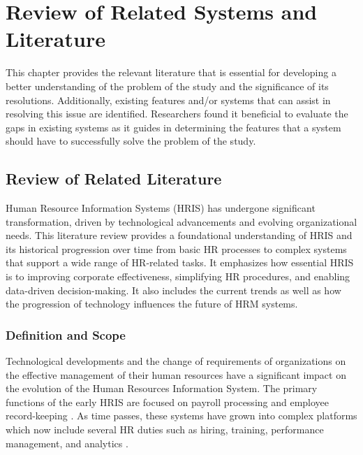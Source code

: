 \chapter{Review of Related Systems and Literature}

This chapter provides the relevant literature that is essential for developing a better understanding of the problem of the study and the significance of its resolutions. Additionally, existing features and/or systems that can assist in resolving this issue are identified. Researchers found it beneficial to evaluate the gaps in existing systems as it guides in determining the features that a system should have to successfully solve the problem of the study.


\section{Review of Related Literature}
    Human Resource Information Systems (HRIS) has undergone significant transformation, driven by technological advancements and evolving organizational needs. This literature review provides a foundational understanding of HRIS and its historical progression over time from basic HR processes to complex systems that support a wide range of HR-related tasks. It emphasizes how essential HRIS is to improving corporate effectiveness, simplifying HR procedures, and enabling data-driven decision-making. It also includes the current trends as well as how the progression of technology influences the future of HRM systems.
    
    \subsection{Definition and Scope}
        Technological developments and the change of requirements of organizations on the effective management of their human resources have a significant impact on the evolution of the Human Resources Information System. The primary functions of the early HRIS are focused on payroll processing and employee record-keeping \cite{srr12023}. As time passes, these systems have grown into complex platforms which now include several HR duties such as hiring, training, performance management, and analytics \cite{ml12019}.
        
